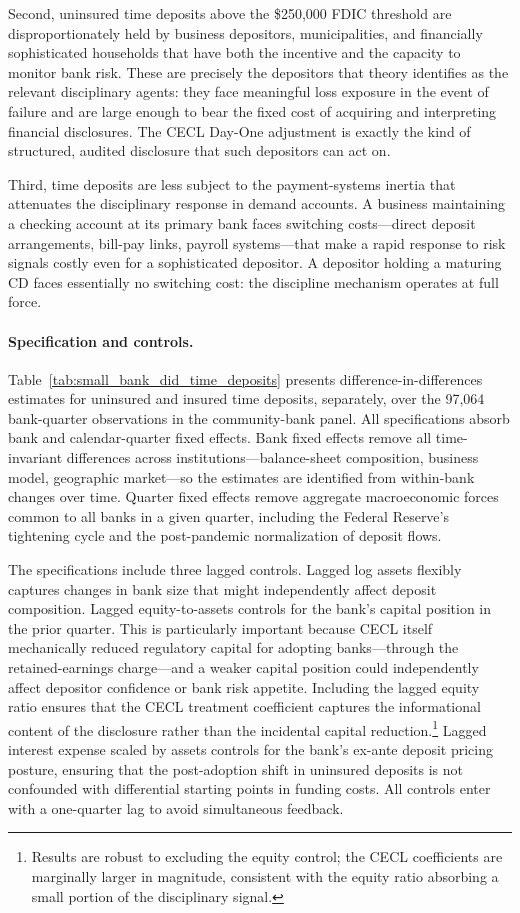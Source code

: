 Second, uninsured time deposits above the \$250{,}000 FDIC threshold are
disproportionately held by business depositors, municipalities, and financially
sophisticated households that have both the incentive and the capacity to monitor
bank risk.  These are precisely the depositors that theory identifies as the
relevant disciplinary agents: they face meaningful loss exposure in the event of
failure and are large enough to bear the fixed cost of acquiring and interpreting
financial disclosures.  The CECL Day-One adjustment is exactly the kind of
structured, audited disclosure that such depositors can act on.

Third, time deposits are less subject to the payment-systems inertia that
attenuates the disciplinary response in demand accounts.  A business maintaining a
checking account at its primary bank faces switching costs---direct deposit
arrangements, bill-pay links, payroll systems---that make a rapid response to risk
signals costly even for a sophisticated depositor.  A depositor holding a maturing
CD faces essentially no switching cost: the discipline mechanism operates at full
force.

\paragraph{Specification and controls.}
Table~\ref{tab:small_bank_did_time_deposits} presents difference-in-differences
estimates for uninsured and insured time deposits, separately, over the 97,064
bank-quarter observations in the community-bank panel.  All specifications absorb
bank and calendar-quarter fixed effects.  Bank fixed effects remove all
time-invariant differences across institutions---balance-sheet composition,
business model, geographic market---so the estimates are identified from
within-bank changes over time.  Quarter fixed effects remove aggregate
macroeconomic forces common to all banks in a given quarter, including the Federal
Reserve's tightening cycle and the post-pandemic normalization of deposit flows.

The specifications include three lagged controls.  Lagged log assets flexibly
captures changes in bank size that might independently affect deposit composition.
Lagged equity-to-assets controls for the bank's capital position in the prior
quarter.  This is particularly important because CECL itself mechanically reduced
regulatory capital for adopting banks---through the retained-earnings charge---and
a weaker capital position could independently affect depositor confidence or bank
risk appetite.  Including the lagged equity ratio ensures that the CECL treatment
coefficient captures the informational content of the disclosure rather than the
incidental capital reduction.\footnote{Results are robust to excluding the equity
control; the CECL coefficients are marginally larger in magnitude, consistent with
the equity ratio absorbing a small portion of the disciplinary signal.}
Lagged interest expense scaled by assets controls for the bank's ex-ante deposit
pricing posture, ensuring that the post-adoption shift in uninsured deposits is
not confounded with differential starting points in funding costs.  All controls
enter with a one-quarter lag to avoid simultaneous feedback.

